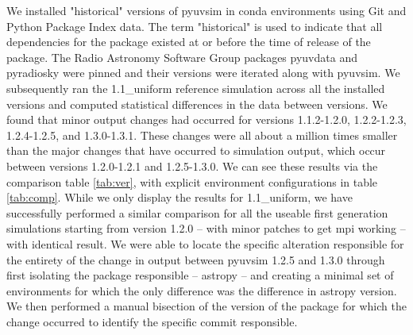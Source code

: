 \documentclass[]{article}
\begin{document}
We installed "historical" versions of pyuvsim in conda environments using Git and Python Package Index data. The term "historical" is used to indicate that all dependencies for the package existed at or before the time of release of the package. The Radio Astronomy Software Group packages pyuvdata and pyradiosky were pinned and their versions were iterated along with pyuvsim. We subsequently ran the 1.1\_uniform reference simulation across all the installed versions and computed statistical differences in the data between versions. We found that minor output changes had occurred for versions 1.1.2-1.2.0, 1.2.2-1.2.3, 1.2.4-1.2.5, and 1.3.0-1.3.1. These changes were all about a million times smaller than the major changes that have occurred to simulation output, which occur between versions 1.2.0-1.2.1 and 1.2.5-1.3.0. We can see these results via the comparison table \ref{tab:ver}, with explicit environment configurations in table \ref{tab:comp}. While we only display the results for 1.1\_uniform, we have successfully performed a similar comparison for all the useable first generation simulations starting from version 1.2.0 -- with minor patches to get mpi working -- with identical result. We were able to locate the specific alteration responsible for the entirety of the change in output between pyuvsim 1.2.5 and 1.3.0 through first isolating the package responsible -- astropy -- and creating a minimal set of environments for which the only difference was the difference in astropy version. We then performed a manual bisection of the version of the package for which the change occurred to identify the specific commit responsible.
\end{document}
